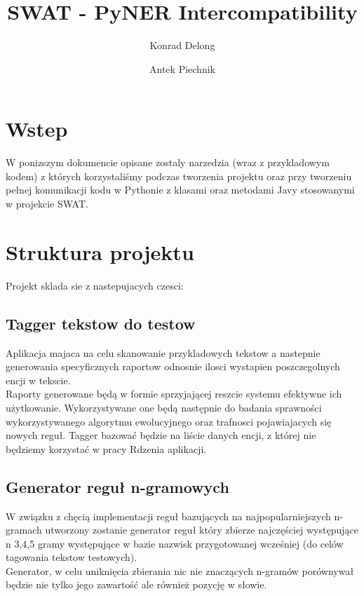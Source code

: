 \documentclass[12pt]{article}
\author{Konrad Delong \and Antek Piechnik}
\title{SWAT - PyNER Intercompatibility}
\begin{document}
\maketitle
\tableofcontents
\newpage

\section{Wstep}
W ponizszym dokumencie opisane zostaly narzedzia (wraz z przykladowym kodem) z których korzystaliśmy podczas tworzenia projektu oraz przy tworzeniu pełnej komunikacji kodu w Pythonie z klasami oraz metodami Javy stosowanymi w projekcie SWAT.
\section{Struktura projektu}
Projekt sklada sie z nastepujacych czesci:
\subsection{Tagger tekstow do testow}
Aplikacja majaca na celu skanowanie przykladowych tekstow a nastepnie generowania specyficznych raportow odnosnie ilosci wystapien poszczegolnych encji w tekscie. 
\\Raporty generowane będą w formie sprzyjającej reszcie systemu efektywne ich użytkowanie. Wykorzystywane one będą następnie do badania sprawności wykorzystywanego algorytmu ewolucyjnego oraz trafnosci pojawiajacych się nowych reguł. 
Tagger bazować będzie na liście danych encji, z której nie będziemy korzystać w pracy Rdzenia aplikacji.
\subsection{Generator reguł n-gramowych}
W związku z chęcią implementacji reguł bazujących na najpopularniejszych n-gramach utworzony zostanie generator reguł który zbierze najczęściej występujące n {3,4,5} gramy występujące w bazie nazwisk przygotowanej wcześniej (do celów tagowania tekstow testowych). 
\\Generator, w celu uniknięcia zbierania nic nie znaczących n-gramów porównywał będzie nie tylko jego zawartość ale również pozycję w słowie.
\end{document}
